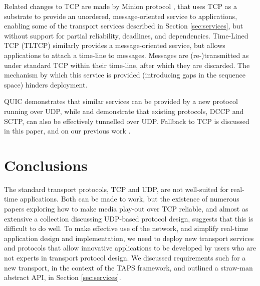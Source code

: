\documentclass[10pt]{sig-alternate-05-2015}
\begin{document}
%
%

Related changes to TCP are made by Minion protocol \cite{nowlan:2012:minion},
that uses TCP as a substrate to provide an unordered, message-oriented
service to applications, enabling some of the transport services described
in Section \ref{sec:services}, but without support for partial reliability,
deadlines, and dependencies.
Time-Lined TCP (TLTCP) \cite{mukherjee:2000:timelines} similarly provides a
message-oriented service, but allows applications to attach a time-line
to messages. Messages are (re-)transmitted as under standard TCP within
their time-line, after which they are discarded. The mechanism by which
this service is provided (introducing gaps in the sequence space) hinders
deployment. 

QUIC \cite{draft-tsvwg-quic-protocol-02} demonstrates that similar services
can be provided by a new protocol running over UDP, while \cite{RFC6773} and
\cite{draft-ietf-rtcweb-data-channel-13} demonstrate that existing protocols,
DCCP and SCTP, can also be effectively tunnelled over UDP. Fallback to TCP
is discussed in this paper, and on our previous work \cite{mcquistin2016hollywood}.

\section{Conclusions}
\label{sec:conclusions}

The standard transport protocols, TCP and UDP, are not well-suited for
real-time applications. Both can be made to work, but the existence of
numerous papers exploring how to make media play-out over TCP reliable, 
and almost as extensive a collection discussing UDP-based protocol design,
suggests that this is difficult to do well. To make effective use of the
network, and simplify real-time application design and implementation, we
need to deploy new transport services and protocols that allow innovative
applications to be developed by users who are not experts in transport 
protocol design. We discussed requirements such for a new transport, in
the context of the TAPS framework, and outlined a straw-man abstract API,
in Section \ref{sec:services}.
\end{document}
